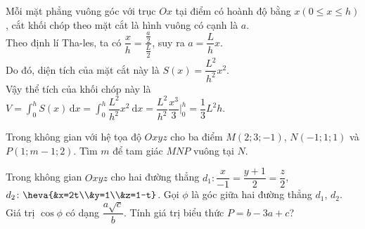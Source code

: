 \begin{bt}
{		Mỗi mặt phẳng vuông góc với trục $Ox$ tại điểm có hoành độ bằng $x(0 \leq x \leq h)$, cắt khối chóp theo mặt cắt là hình vuông có cạnh là $a$.\\
		Theo định lí Tha-les, ta có $\dfrac{x}{h}=\dfrac{\frac{a}{2}}{\frac{L}{2}}$, suy ra $a=\dfrac{L}{h} x$.\\
		Do đó, diện tích của mặt cắt này là $S(x)=\dfrac{L^2}{h^2} x^2$.\\
		Vậy thể tích của khối chóp này là $V=\displaystyle\int_0^h S(x) \mathrm{\,d} x=\displaystyle\int_0^h \dfrac{L^2}{h^2} x^2 \mathrm{~d}x=\left.\dfrac{L^2}{h^2} \dfrac{x^3}{3}\Bigg|_0^h \right. =\dfrac{1}{3} L^2h$.
	}
\end{bt}

\begin{bt}%
	Trong không gian với hệ tọa độ $Oxyz$ cho ba điểm $M\left(2; 3; -1\right)$, $N\left(-1;1;1\right)$ và $P\left(1;m-1; 2\right)$. Tìm $m$ để tam giác $MNP$ vuông tại  $N$.
\end{bt}

\begin{bt}%
	 Trong không gian $Oxyz$ cho hai đường thẳng $d_1\colon \dfrac{x}{-1}=\dfrac{y+1}{2}=\dfrac{z}{2}$, $d_2\colon \heva{&x=2t\\&y=1\\&z=1-t}$. Gọi $\phi$ là góc giữa hai đường thẳng $d_1$, $d_2$. Giá trị $\cos\phi$ có dạng $\dfrac{a\sqrt{c}}{b}$. Tính giá trị biểu thức $P=b-3a+c$?
\end{bt}

